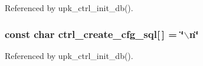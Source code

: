 Referenced by upk\_\-ctrl\_\-init\_\-db().

\subsubsection[{ctrl\_\-create\_\-cfg\_\-sql}]{\setlength{\rightskip}{0pt plus 5cm}const char {\bf ctrl\_\-create\_\-cfg\_\-sql}[$\,$] = \char`\"{}$\backslash$n\char`\"{}}\label{ctrl__sql_8h_aae165476301fc7caf5be70659c5064d7}


Referenced by upk\_\-ctrl\_\-init\_\-db().

